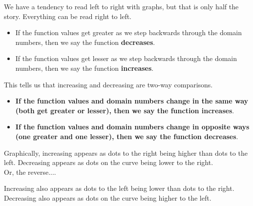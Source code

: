 \documentclass{ximera}
\begin{document}
\begin{warning}
We have a tendency to read left to right with graphs, but that is only half the story.  Everything can be read right to left. \\


\begin{itemize}
    \item If the function values get greater as we step backwards through the domain numbers, then we say the function \textbf{decreases}.  
    \item If the function values get lesser as we step backwards through the domain numbers, then we say the function \textbf{increases}.  
\end{itemize}


This tells us that increasing and decreasing are two-way comparisons.

\begin{itemize}
    \item \textbf{\textcolor{purple!85!blue}{If the function values and domain numbers change in the same way (both get greater or lesser), then we say the function \textbf{increases}}}.  
    \item \textbf{\textcolor{purple!85!blue}{If the function values and domain numbers change in opposite ways (one greater and one lesser), then we say the function \textbf{decreases}}}. 
\end{itemize}






\end{warning}















Graphically, increasing appears as dots to the right being higher than dots to the left.  Decreasing appears as dots on the curve being lower to the right. \\


Or, the reverse....


Increasing also appears as dots to the left being lower than dots to the right.  \\

Decreasing also appears as dots on the curve being higher to the left. \\
\end{document}
